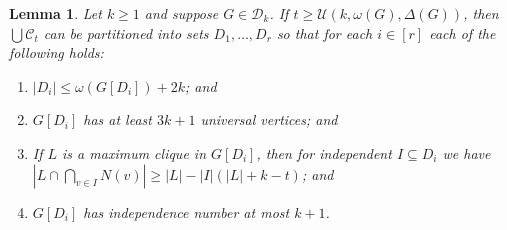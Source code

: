 \documentclass[12pt]{article}
\theoremstyle{plain}
\newtheorem{lem}[thm]{Lemma}
\theoremstyle{definition}
\theoremstyle{remark}
\newcommand{\fancy}[1]{\mathcal{#1}}
\newcommand{\CC}{\fancy{C}}
\newcommand{\D}{\fancy{D}}
\newcommand{\card}[1]{\left|#1\right|}
\newcommand{\irange}[1]{\left[#1\right]}
\def\D{\fancy{D}}
\begin{document}
\begin{lem}\label{GeneralPartitionUniversalPrime}
Let $k \geq 1$ and suppose $G \in \D_k$. If $t \geq \fancy{U}(k, \omega(G), \Delta(G))$, then $\bigcup \CC_t$ can be partitioned into sets $D_1, \ldots, D_r$ so that for each $i \in \irange{r}$ each of the following holds:
\begin{enumerate}
\item $\card{D_i} \leq \omega(G[D_i]) + 2k$; and
\item $G[D_i]$ has at least $3k+1$ universal vertices; and
\item If $L$ is a maximum clique in $G[D_i]$, then for independent $I \subseteq D_i$ we have $\card{L \cap \bigcap_{v \in I} N(v)} \geq \card{L} - \card{I}(\card{L} + k - t)$; and
\item $G[D_i]$ has independence number at most $k+1$.
\end{enumerate}
\end{lem}
\end{document}
